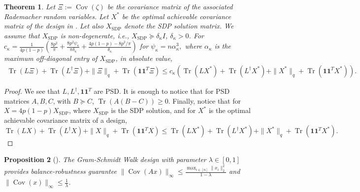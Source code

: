 \documentclass[12pt]{article}
\newtheorem{theorem}{Theorem}
\newtheorem{proposition}[theorem]{Proposition}
\theoremstyle{definition}
\numberwithin{equation}{section}
\numberwithin{figure}{section}
\newcommand{\cov}{\operatorname{Cov}}
\numberwithin{equation}{section}
\numberwithin{figure}{section}
\begin{document}
\renewcommand{\thetheorem}{\ref{corr:approximation_bound}} 


\addtocounter{theorem}{-1} 

\begin{theorem}
    Let $\Xi := \cov(\zeta)$ be the covariance matrix of the associated Rademacher random variables. Let $X^*$ be the optimal achievable covariance matrix of the design in . 
    Let also $X_{\text{SDP}}$ denote the SDP solution matrix. We assume that $X_{\text{SDP}}$ is non-degenerate, i.e., $X_{\text{SDP}} \succeq \delta_\kappa I$, $\delta_\kappa > 0$. For $c_\kappa =\frac{1}{4p(1-p)} \left( \frac{8p^2}{\pi}  + \frac{8p^2 \psi_\kappa}{\pi \delta_\kappa} + \frac{4p(1-p) - 8p^2/\pi}{\delta_\kappa}  \right)$ for $\psi_\kappa= n \alpha_\kappa^{3},$ where $\alpha_\kappa$ is the maximum off-diagonal entry of $X_{\text{SDP}}$, in absolute value, 
    \begin{align*}
        \operatorname{Tr}(L\Xi) + \operatorname{Tr}(L^\dagger\Xi ) +  \|\Xi \|_{q} + \operatorname{Tr}(\mathbf{1} \mathbf{1}^T \Xi) \leq c_\kappa \left( \operatorname{Tr}(LX^*) +  \operatorname{Tr}(L^\dagger X^*)+  \| X^*\|_{q}  + \operatorname{Tr}(\mathbf{1} \mathbf{1}^T X^*)\right).
    \end{align*}
\end{theorem}
\endgroup

\begin{proof}
We see that $L, L^{\dagger}, \mathbf{1} \mathbf{1}^T$ are PSD. It is enough to notice that for PSD matrices $A, B, C$, with $B \succeq C$, $\operatorname{Tr}(A(B-C)) \geq 0$. Finally, notice that for $X = 4p(1-p) X_{\operatorname{SDP}}$, where $X_{\operatorname{SDP}}$ is the SDP solution, and for $X^*$ is the optimal achievable covariance matrix of a design, $\operatorname{Tr}(LX) +  \operatorname{Tr}(L^\dagger X)+  \| X\|_{q}  + \operatorname{Tr}(\mathbf{1} \mathbf{1}^T X) \leq \operatorname{Tr}(LX^*) +  \operatorname{Tr}(L^\dagger X^*)+  \| X^*\|_{q}  + \operatorname{Tr}(\mathbf{1} \mathbf{1}^T X^*).$   
\end{proof}


\begin{proposition}[{\citealp[Theorem 6.4]{harshaw2024balancing}}] \label{thm_gsw}
The Gram-Schmidt Walk design with parameter $\lambda \in [0,1]$ provides balance-robustness guarantee
$\| \operatorname{Cov}(Ax) \|_\infty \leq \frac{\max_{i \in [n]} \| x_i\| _2^2}{1-\lambda}$ and $\| \operatorname{Cov}(x) \|_\infty \leq \frac{1}{\lambda}$.
\end{proposition}
\end{document}
